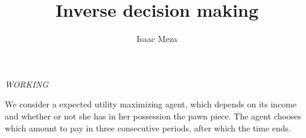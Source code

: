 \documentclass{amsart}
\theoremstyle{named}
\begin{document}
\title{Inverse decision making}
\author{Isaac Meza}
\address{University of California, Berkeley - IEOR}
\curraddr{}





\maketitle


\begin{center}
    \textit{WORKING}
\end{center}

We consider a expected utility maximizing agent, which depends on its income and whether or not she has in her possession the pawn piece. The agent chooses which amount to pay in three consecutive periods, after which the time ends.\\





\end{document}
